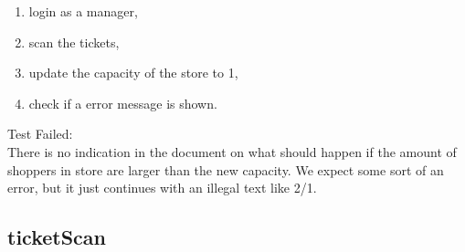 \begin{itemize}
\begin{enumerate}
        \item login as a manager,

        \item scan the tickets,

        \item update the capacity of the store to 1,

        \item check if a error message is shown.
    \end{enumerate}
    Test Failed: \\
    There is no indication in the document on what should happen if the amount of shoppers in store are larger than the new capacity.
    We expect some sort of an error, but it just continues with an illegal text like 2/1.
\end{itemize}

\subsection{ticketScan}

